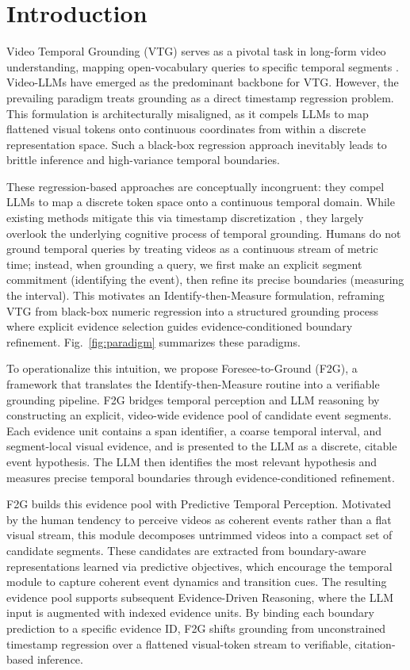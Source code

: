 \documentclass{article}
\theoremstyle{plain}
\theoremstyle{definition}
\theoremstyle{remark}
\begin{document}
\section{Introduction}
Video Temporal Grounding (VTG) serves as a pivotal task in long-form video understanding, mapping open-vocabulary queries to specific temporal segments \cite{vtg2,vtg1,tea,interventional,survey23,survey25}.
Video-LLMs have emerged as the predominant backbone for VTG. However, the prevailing paradigm treats grounding as a direct timestamp regression problem. This formulation is architecturally misaligned, as it compels LLMs to map flattened visual tokens onto continuous coordinates from within a discrete representation space. Such a black-box regression approach inevitably leads to brittle inference and high-variance temporal boundaries.

These regression-based approaches are conceptually incongruent: they compel LLMs to map a discrete token space onto a continuous temporal domain. While existing methods mitigate this via timestamp discretization \cite{VTimeLLM,Momentor,TimeChat,TRACE}, they largely overlook the underlying cognitive process of temporal grounding. Humans do not ground temporal queries by treating videos as a continuous stream of metric time; instead, when grounding a query, we first make an explicit segment commitment (identifying the event), then refine its precise boundaries (measuring the interval). 
This motivates an Identify-then-Measure formulation, reframing VTG from black-box numeric regression into a structured grounding process where explicit evidence selection guides evidence-conditioned boundary refinement. Fig.~\ref{fig:paradigm} summarizes these paradigms.


To operationalize this intuition, we propose Foresee-to-Ground (F2G), a framework that translates the Identify-then-Measure routine into a verifiable grounding pipeline. F2G bridges temporal perception and LLM reasoning by constructing an explicit, video-wide evidence pool of candidate event segments. Each evidence unit contains a span identifier, a coarse temporal interval, and segment-local visual evidence, and is presented to the LLM as a discrete, citable event hypothesis. The LLM then identifies the most relevant hypothesis and measures precise temporal boundaries through evidence-conditioned refinement.

F2G builds this evidence pool with Predictive Temporal Perception. 
Motivated by the human tendency to perceive videos as coherent events rather than a flat visual stream, this module decomposes untrimmed videos into a compact set of candidate segments. 
These candidates are extracted from boundary-aware representations learned via predictive objectives, which encourage the temporal module to capture coherent event dynamics and transition cues.
The resulting evidence pool supports subsequent Evidence-Driven Reasoning, where the LLM input is augmented with indexed evidence units. 
By binding each boundary prediction to a specific evidence ID, F2G shifts grounding from unconstrained timestamp regression over a flattened visual-token stream to verifiable, citation-based inference.
\end{document}
